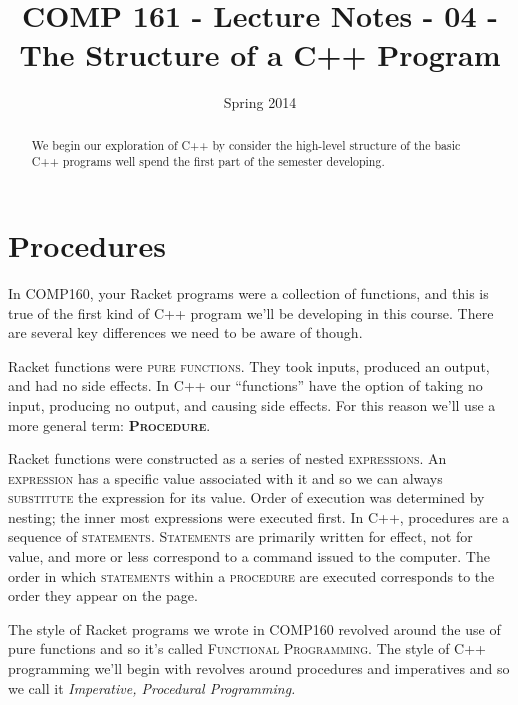 \documentclass[]{tufte-handout}
\title{COMP 161 - Lecture Notes - 04 - The Structure of a C++ Program}
\date{Spring 2014}
\begin{document}
 
\maketitle

\begin{abstract}
We begin our exploration of C++ by consider the high-level structure of the basic C++ programs well spend the first part of the semester developing.  
\end{abstract}

\section{Procedures}
In COMP160, your Racket programs were a collection of functions, and this is true of the first kind of C++ program we'll be developing in this course.  There are several key differences we need to be aware of though. 

Racket functions were \textsc{pure functions}. They took inputs, produced an output, and had no side effects.  In C++ our ``functions'' have the option of taking no input, producing no output, and causing side effects.  For this reason we'll use a more general term: \textsc{\textbf{Procedure}}. 

Racket functions were constructed as a series of nested \textsc{expressions}.  An \textsc{expression} has a specific value associated with it and so we can always \textsc{substitute} the expression for its value. Order of execution was determined by nesting; the inner most expressions were executed first.  In C++, procedures are a sequence of \textsc{statements}.  \textsc{Statements} are primarily written for effect, not for value, and more or less correspond to a command issued to the computer. The order in which \textsc{statements} within a \textsc{procedure} are executed corresponds to the order they appear on the page.

The style of Racket programs we wrote in COMP160 revolved around the use of pure functions and so it's called  \textsc{Functional Programming}.  The style of C++ programming we'll begin with revolves around procedures and imperatives and so we call it \textit{Imperative, Procedural Programming.}
\end{document}
